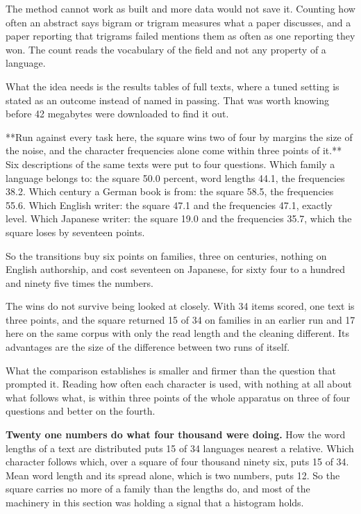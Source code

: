 The method cannot work as built and more data would not save it. Counting how often an abstract says bigram or trigram measures what a paper discusses, and a paper reporting that trigrams failed mentions them as often as one reporting they won. The count reads the vocabulary of the field and not any property of a language.

What the idea needs is the results tables of full texts, where a tuned setting is stated as an outcome instead of named in passing. That was worth knowing before 42 megabytes were downloaded to find it out.

**Run against every task here, the square wins two of four by margins the size of the noise, and the character frequencies alone come within three points of it.** Six descriptions of the same texts were put to four questions. Which family a language belongs to: the square 50.0 percent, word lengths 44.1, the frequencies 38.2. Which century a German book is from: the square 58.5, the frequencies 55.6. Which English writer: the square 47.1 and the frequencies 47.1, exactly level. Which Japanese writer: the square 19.0 and the frequencies 35.7, which the square loses by seventeen points.

So the transitions buy six points on families, three on centuries, nothing on English authorship, and cost seventeen on Japanese, for sixty four to a hundred and ninety five times the numbers.

The wins do not survive being looked at closely. With 34 items scored, one text is three points, and the square returned 15 of 34 on families in an earlier run and 17 here on the same corpus with only the read length and the cleaning different. Its advantages are the size of the difference between two runs of itself.

What the comparison establishes is smaller and firmer than the question that prompted it. Reading how often each character is used, with nothing at all about what follows what, is within three points of the whole apparatus on three of four questions and better on the fourth.

\textbf{Twenty one numbers do what four thousand were doing.} How the word lengths of a text are distributed puts 15 of 34 languages nearest a relative. Which character follows which, over a square of four thousand ninety six, puts 15 of 34. Mean word length and its spread alone, which is two numbers, puts 12. So the square carries no more of a family than the lengths do, and most of the machinery in this section was holding a signal that a histogram holds.

